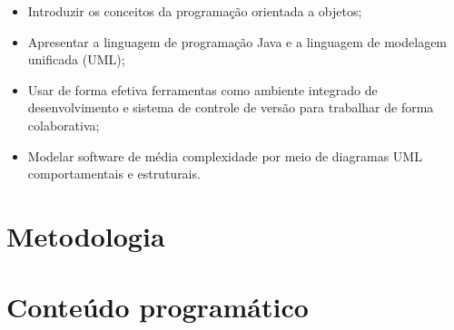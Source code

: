 \documentclass[11pt]{../classes/ifscarticle}
\begin{document}
\begin{itemize}
    \item Introduzir os conceitos da programação orientada a objetos;
    \item Apresentar a linguagem de programação Java e a linguagem de modelagem unificada (UML);
    \item Usar de forma efetiva ferramentas como ambiente integrado de desenvolvimento e sistema de controle de versão para trabalhar de forma colaborativa;
    \item Modelar software de média complexidade por meio de diagramas UML comportamentais e estruturais.
\end{itemize}



\section{Metodologia}

\section{Conteúdo programático}



\nocite{*}


\renewcommand{\refname}{Bibliografia}

\end{document}
